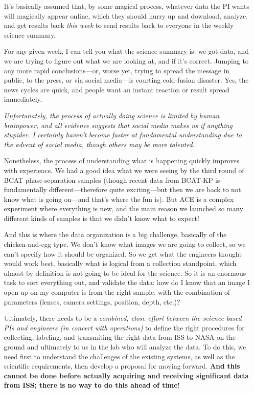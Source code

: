 It's basically assumed that, by some magical process, whatever data the PI wants
will magically appear online, which they should hurry up and download, analyze,
and get results back \emph{this week} to send results back to everyone in the
weekly science summary.

For any given week, I can tell you what the science summary is: we got data, and
we are trying to figure out what we are looking at, and if it's correct. Jumping
to any more rapid conclusions---or, worse yet, trying to spread the message in
public, to the press, or via social media---is courting cold-fusion disaster.
Yes, the news cycles are quick, and people want an instant reaction or result
spread immediately.

\emph{Unfortunately, the process of actually doing science is limited by human brainpower, and all evidence suggests that social media makes us if anything stupider. I certainly haven't become faster at fundamental understanding due to the advent of social media, though others may be more talented.}

Nonetheless, the process of understanding what is happening quickly improves
with experience. We had a good idea what we were seeing by the third round of
BCAT phase-separation samples (though recent data from BCAT-KP is fundamentally
different---therefore quite exciting---but then we are back to not know what is
going on---and that's where the fun is). But ACE is a complex experiment where
everything is new, and the main reason we launched so many different kinds of
samples is that we didn't know what to expect!

And this is where the data organization is a big challenge, basically of the
chicken-and-egg type. We don't know what images we are going to collect, so we
can't specify how it should be organized. So we get what the engineers thought
would work best, basically what is logical from a collection standpoint, which
almost by definition is not going to be ideal for the science. So it is an
enormous task to sort everything out, and validate the data: how do I know that
an image I open up on my computer is from the right sample, with the combination
of parameters (lenses, camera settings, position, depth, etc.)?

Ultimately, there needs to be a \emph{combined, close effort between the
science-based PIs and engineers (in concert with operations)} to define the
right procedures for collecting, labeling, and transmiting the right data from
ISS to NASA on the ground and ultimately to us in the lab who will analyze the
data. To do this, we need first to understand the challenges of the existing
systems, as well as the scientific requirements, then develop a proposal for
moving forward. \textbf{And this cannot be done before actually acquiring and
receiving significant data from ISS; there is no way to do this ahead of time!}

